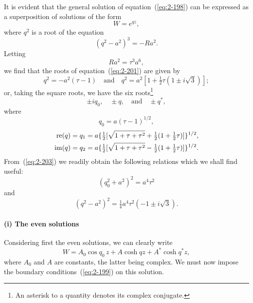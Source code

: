 It is evident that the general solution of equation~(\ref{eq:2-198}) can be expressed as a superposition of solutions of the form
\begin{equation}
\label{eq:2-200}
W = e^{qz},
\end{equation}
where $q^2$ is a root of the equation
\begin{equation}
\label{eq:2-201}
(q^2-a^2)^3 = -Ra^2.
\end{equation}
Letting
\begin{equation}
\label{eq:2-202}
Ra^2 = \tau^3 a^6,
\end{equation}
we find that the roots of equation~(\ref{eq:2-201}) are given by
\begin{equation}
\label{eq:2-203}
q^2 = -a^2(\tau-1) \quad\text{and}\quad q^2 = a^2[1+\tfrac{1}{2}\tau(1\pm i\sqrt{3})];
\end{equation}
or, taking the square roots, we have the six roots\footnote{An asterisk to a quantity denotes its complex conjugate.}
\begin{equation}
\label{eq:2-204}
\pm iq_0, \quad \pm q, \quad\text{and}\quad \pm q^*,
\end{equation}
where
\begin{equation}
\label{eq:2-205}
q_0 = a(\tau - 1)^{1/2},
\end{equation}
\begin{align}
\label{eq:2-206}
\operatorname{re}(q) &= q_1 = a\{\tfrac{1}{2}[\sqrt{1+\tau+\tau^2}+\tfrac{1}{2}(1+\tfrac{1}{2}\tau)]\}^{1/2}, \notag\\
\operatorname{im}(q) &= q_2 = a\{\tfrac{1}{2}[\sqrt{1+\tau+\tau^2}-\tfrac{1}{2}(1+\tfrac{1}{2}\tau)]\}^{1/2}.
\end{align}
From~(\ref{eq:2-203}) we readily obtain the following relations which we shall
find useful:
\begin{equation}
\label{eq:2-207}
(q_0^2+a^2)^2 = a^4\tau^2
\end{equation}
and
\begin{equation}
\label{eq:2-208}
(q^2-a^2)^2 = \tfrac{1}{4}a^4\tau^2(-1\pm i\sqrt{3}).
\end{equation}

\paragraph{(i) The even solutions}

Considering first the even solutions, we can clearly write
\begin{equation}
\label{eq:2-209}
W = A_0\cos q_0\,z + A\cosh qz + A^*\cosh q^*z,
\end{equation}
where $A_0$ and $A$ are constants, the latter being complex. We must now
impose the boundary conditions~(\ref{eq:2-199}) on this solution.

